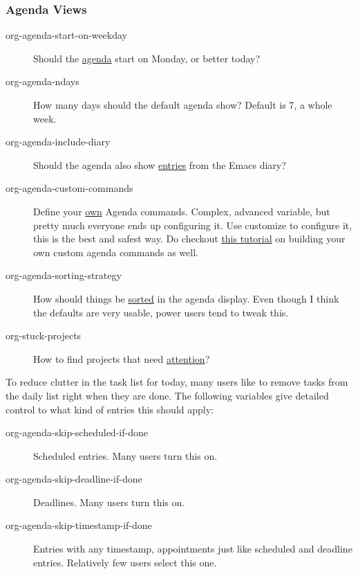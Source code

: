 \documentclass[11pt]{article}
\begin{document}
\subsubsection*{Agenda Views}
\label{sec:org57dc34e}


\begin{description}
\item[{org-agenda-start-on-weekday}] Should the \href{http://orgmode.org/manual/Weekly\_002fdaily-agenda.html\#Weekly\_002fdaily-agenda}{agenda} start on Monday, or
better today?

\item[{org-agenda-ndays}] How many days should the default agenda show?
Default is 7, a whole week.

\item[{org-agenda-include-diary}] Should the agenda also show \href{http://orgmode.org/manual/Weekly\_002fdaily-agenda.html\#Weekly\_002fdaily-agenda}{entries} from
the Emacs diary?

\item[{org-agenda-custom-commands}] Define your \href{http://orgmode.org/manual/Custom-agenda-views.html\#Custom-agenda-views}{own} Agenda commands.
Complex, advanced variable, but pretty much everyone ends up
configuring it.  Use customize to configure it, this is the best
and safest way.  Do checkout \href{http://orgmode.org/worg/org-tutorials/org-custom-agenda-commands.php}{this tutorial} on building your own
custom agenda commands as well.

\item[{org-agenda-sorting-strategy}] How should things be \href{http://orgmode.org/manual/Sorting-of-agenda-items.html\#Sorting-of-agenda-items}{sorted} in the
agenda display.  Even though I think the defaults are very usable,
power users tend to tweak this.

\item[{org-stuck-projects}] How to find projects that need \href{http://orgmode.org/manual/Stuck-projects.html\#Stuck-projects}{attention}?
\end{description}

To reduce clutter in the task list for today, many users like to
remove tasks from the daily list right when they are done.  The
following variables give detailed control to what kind of entries this
should apply:

\begin{description}
\item[{org-agenda-skip-scheduled-if-done}] Scheduled entries.  Many users
turn this on.

\item[{org-agenda-skip-deadline-if-done }] Deadlines.  Many users turn
this on.

\item[{org-agenda-skip-timestamp-if-done}] Entries with any timestamp,
appointments just like scheduled and deadline entries.
Relatively few users select this one.
\end{description}
\end{document}
